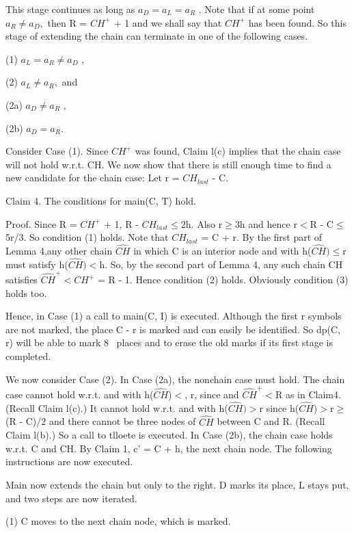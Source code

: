 \documentclass[11pt,a4paper]{report}
\begin{document}
This stage continues as long as $a_D = a_L = a_R$ . Note that if at some point $a_R \neq a_D ,$
then R = $CH^{+}$ + 1 and we shall say that $CH^{+}$ has been found. So this stage of extending
the chain can terminate in one of the following cases.

(1) $a_L = a_R \neq a_D$ ,

(2) $a_L\neq a_R ,$ and
\begin{myindentpar}{4em}

(2a) $a_D \neq a_R$ ,

(2b) $a_D = a_R$.
\end{myindentpar}

Consider Case (1). Since $CH^{+}$ was found, Claim l(c) implies that the chain case will
not hold w.r.t. CH. We now show that there is still enough time to find a new candidate
for the chain case: Let r = $CH_{last}$ - C.

Claim 4. The conditions for main(C, T) hold.

Proof. Since R = $CH^{+}$ + 1, R - $CH_{last}\leq$2h. Also r$\geq$3h and hence r$<$R -
C$\leq$5r/3. So condition (1) holds. Note that $CH_{last}$ = C + r. By the first part of Lemma
4,any other chain $\hat{CH}$ in which C is an interior node and with h($\hat{CH})\leq$r must satisfy
h($\hat{CH})<$h. So, by the second part of Lemma 4, any such chain CH satisfies 
$\hat{CH}^{+} < CH^{+}$ = R - 1. Hence condition (2) holds. Obviously condition (3) holds too. 

Hence, in Case (1) a call to main(C, I) is executed. Although the first r symbols are
not marked, the place C - r is marked and can easily be identified. So dp(C, r) will be
able to mark 8~ places and to erase the old marks if its first stage is completed.

We now consider Case (2). In Case (2a), the nonchain case must hold. The chain case
cannot hold w.r.t.  and with h($\hat{CH}$)$<$, r, since  and $\hat{CH}^{+}<$R as in Claim4. (Recall Claim l(c).)
It cannot hold w.r.t.  and  with h($\hat{CH})>$r since h($\hat{CH}$)$>$r$\geq$(R - C)/2 and there
cannot be three nodes of $\hat{CH}$ between C and R. (Recall Claim l(b).) So a call to tlloete is
executed. In Case (2b), the chain case holds w.r.t. C and CH. By Claim 1, c’ = C + h,
the next chain node. The following instructions are now executed.

Main now extends the chain but only to the right. D marks its place, L stays put, and
two steps are now iterated.

(1) C moves to the next chain node, which is marked.
\end{document}
